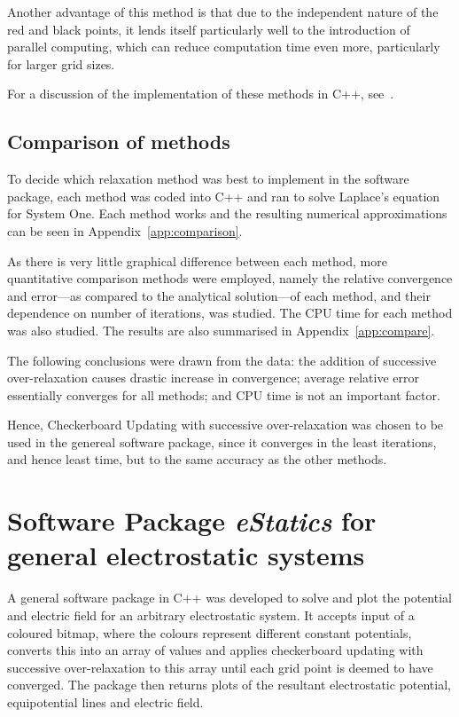 \documentclass[11pt, a4paper]{article}
\begin{document}
Another advantage of this method is that due to the independent nature of the red and
black points, it lends itself particularly well to the introduction of parallel 
computing, which can reduce computation time even more, particularly for larger grid
sizes.

For a discussion of the implementation of these methods in C++, see~\cite{nr}.

\subsection{Comparison of methods}

To decide which relaxation method was best to implement in the software package,
each method was coded into C++ and ran to solve Laplace's equation for System One.
Each method works and the resulting numerical approximations can be seen in
Appendix~\ref{app:comparison}.

As there is very little graphical difference between each method, more quantitative
comparison methods were employed, namely the relative convergence and error---as
compared to the analytical solution---of each method, and their dependence on number
of iterations, was studied. The CPU time for each method was also studied. The results
are also summarised in Appendix~\ref{app:compare}.

The following conclusions were drawn from the data: the addition of successive
over-relaxation causes drastic increase in convergence; average relative error
essentially converges for all methods; and CPU time is not an important factor.

Hence, Checkerboard Updating with successive over-relaxation was chosen to be used
in the genereal software package, since it converges in the least iterations,
and hence least time, but to the same accuracy as the other methods.

\section{Software Package \emph{eStatics} for general electrostatic systems}

A general software package in C++ was developed to solve and plot the potential and
electric field for an arbitrary electrostatic system. It accepts input of a coloured
bitmap, where the colours represent different constant potentials, converts this into
an array of values and applies checkerboard updating with successive over-relaxation
to this array until each grid point is deemed to have converged. The package then
returns plots of the resultant electrostatic potential, equipotential lines and electric
field.
\end{document}

